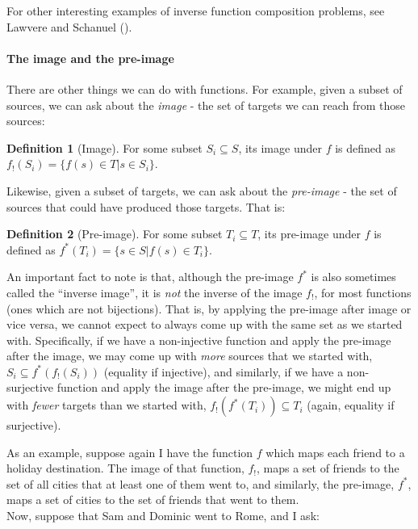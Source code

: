 \documentclass[
  openany]{book}
\theoremstyle{definition}
\newtheorem{definition}{Definition}[chapter]
\theoremstyle{definition}
\theoremstyle{definition}
\theoremstyle{definition}
\theoremstyle{remark}
\begin{document}
For other interesting examples of inverse function composition problems, see Lawvere and Schanuel ().

\paragraph{The image and the pre-image}\label{the-image-and-the-pre-image}

There are other things we can do with functions. For example, given a subset of sources, we can ask about the \emph{image} - the set of targets we can reach from those sources:

\begin{definition}[Image]
For some subset \(S_i \subseteq S\), its image under \(f\) is defined as \(f_!(S_i) = \{ f(s) \in T \lvert s \in S_i \}\).
\end{definition}

Likewise, given a subset of targets, we can ask about the \emph{pre-image} - the set of sources that could have produced those targets. That is:

\begin{definition}[Pre-image]
For some subset \(T_i \subseteq T\), its pre-image under \(f\) is defined as \(f^*(T_i) = \{ s \in S \lvert f(s) \in T_i \}\).
\end{definition}

An important fact to note is that, although the pre-image \(f^*\) is also sometimes called the ``inverse image'', it is \emph{not} the inverse of the image \(f_!\), for most functions (ones which are not bijections). That is, by applying the pre-image after image or vice versa, we cannot expect to always come up with the same set as we started with. Specifically, if we have a non-injective function and apply the pre-image after the image, we may come up with \emph{more} sources that we started with, \(S_i \subseteq f^*(f_!(S_i))\) (equality if injective), and similarly, if we have a non-surjective function and apply the image after the pre-image, we might end up with \emph{fewer} targets than we started with, \(f_!(f^*(T_i)) \subseteq T_i\) (again, equality if surjective).

As an example, suppose again I have the function \(f\) which maps each friend to a holiday destination. The image of that function, \(f_!\), maps a set of friends to the set of all cities that at least one of them went to, and similarly, the pre-image, \(f^*\), maps a set of cities to the set of friends that went to them.\\
Now, suppose that Sam and Dominic went to Rome, and I ask:
\end{document}
